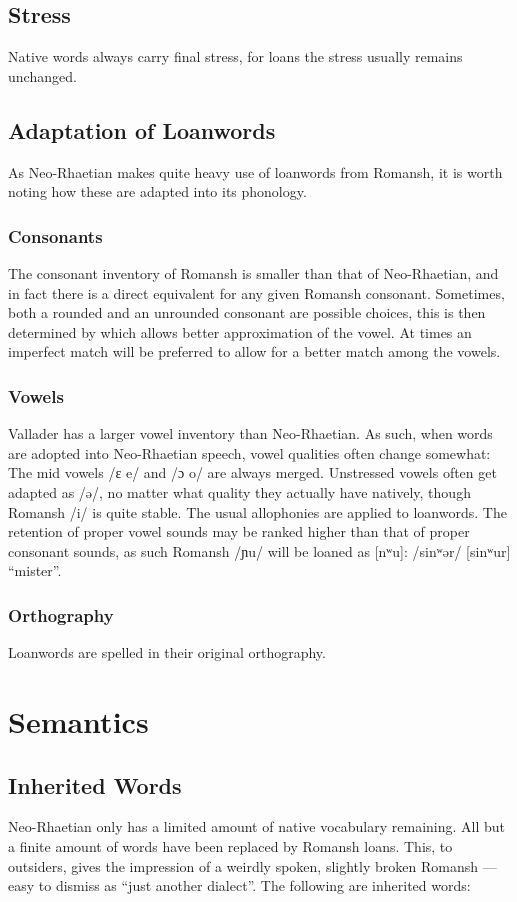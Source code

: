\documentclass{article}
\newcommand{\en}[1]{``#1''}
\newcommand{\con}[1]{\hspace{0pt}{\color{olive}#1}}
\newcommand{\langname}{Neo-Rhaetian}
\begin{document}
\subsection{Stress}
Native words always carry final stress, for loans the stress usually remains unchanged.

\subsection{Adaptation of Loanwords}
As \langname{} makes quite heavy use of loanwords from Romansh, it is worth noting how these are adapted into its phonology. 

\subsubsection{Consonants}
The consonant inventory of Romansh is smaller than that of \langname{}, and in fact there is a direct equivalent for any given Romansh consonant. Sometimes, both a rounded and an unrounded consonant are possible choices, this is then determined by which allows better approximation of the vowel. At times an imperfect match will be preferred to allow for a better match among the vowels.

\subsubsection{Vowels}
Vallader has a larger vowel inventory than \langname{}. As such, when words are adopted into \langname{} speech, vowel qualities often change somewhat: The mid vowels /ɛ e/ and /ɔ o/ are always merged. Unstressed vowels often get adapted as /ə/, no matter what quality they actually have natively, though Romansh /i/ is quite stable. The usual allophonies are applied to loanwords. The retention of proper vowel sounds may be ranked higher than that of proper consonant sounds, as such Romansh /ɲu/ will be loaned as [nʷu]: \con{signur} /sinʷər/ [sinʷur] \en{mister}.

\subsubsection{Orthography}
Loanwords are spelled in their original orthography.

\newpage
\section{Semantics} 
\subsection{Inherited Words}
\langname{} only has a limited amount of native vocabulary remaining. All but a finite amount of words have been replaced by Romansh loans. This, to outsiders, gives the impression of a weirdly spoken, slightly broken Romansh — easy to dismiss as “just another dialect”. The following are inherited words:
\end{document}
